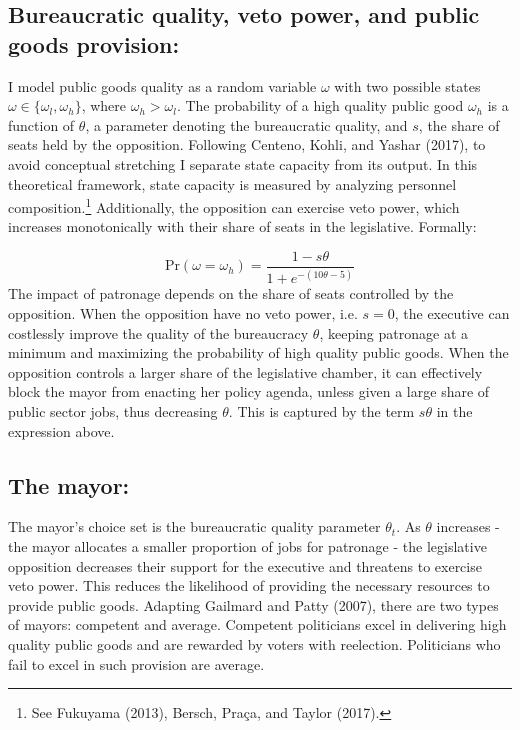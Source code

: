\documentclass[12pt,]{article}
\let\rmarkdownfootnote\footnote%
\def\footnote{\protect\rmarkdownfootnote}
\begin{document}
\hypertarget{bureaucratic-quality-veto-power-and-public-goods-provision}{%
\subsection{Bureaucratic quality, veto power, and public goods
provision:}\label{bureaucratic-quality-veto-power-and-public-goods-provision}}

I model public goods quality as a random variable \(\omega\) with two
possible states \(\omega \in \{\omega_l, \omega_h\}\), where
\(\omega_h>\omega_l\). The probability of a high quality public good
\(\omega_h\) is a function of \(\theta\), a parameter denoting the
bureaucratic quality, and \(s\), the share of seats held by the
opposition. Following Centeno, Kohli, and Yashar (2017), to avoid
conceptual stretching I separate state capacity from its output. In this
theoretical framework, state capacity is measured by analyzing personnel
composition.\footnote{See Fukuyama (2013), Bersch, Praça, and Taylor
  (2017).} Additionally, the opposition can exercise veto power, which
increases monotonically with their share of seats in the legislative.
Formally:

\[\text{Pr}(\omega=\omega_h) = \frac{1-s\theta}{1+e^{-(10\theta-5)}}\]
The impact of patronage depends on the share of seats controlled by the
opposition. When the opposition have no veto power, i.e. \(s=0\), the
executive can costlessly improve the quality of the bureaucracy
\(\theta\), keeping patronage at a minimum and maximizing the
probability of high quality public goods. When the opposition controls a
larger share of the legislative chamber, it can effectively block the
mayor from enacting her policy agenda, unless given a large share of
public sector jobs, thus decreasing \(\theta\). This is captured by the
term \(s\theta\) in the expression above.

\hypertarget{the-mayor}{%
\subsection{The mayor:}\label{the-mayor}}

The mayor's choice set is the bureaucratic quality parameter
\(\theta_t\). As \(\theta\) increases - the mayor allocates a smaller
proportion of jobs for patronage - the legislative opposition decreases
their support for the executive and threatens to exercise veto power.
This reduces the likelihood of providing the necessary resources to
provide public goods. Adapting Gailmard and Patty (2007), there are two
types of mayors: competent and average. Competent politicians excel in
delivering high quality public goods and are rewarded by voters with
reelection. Politicians who fail to excel in such provision are average.
\end{document}
